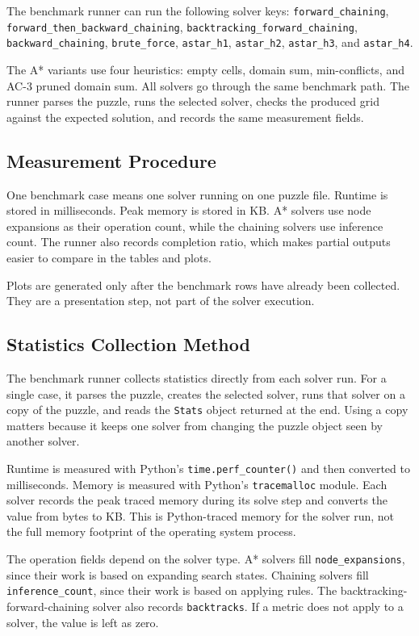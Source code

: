 The benchmark runner can run the following solver keys:
\texttt{forward\_chaining},
\texttt{forward\_then\_backward\_chaining},
\texttt{backtracking\_forward\_chaining},
\texttt{backward\_chaining},
\texttt{brute\_force},
\texttt{astar\_h1},
\texttt{astar\_h2},
\texttt{astar\_h3}, and
\texttt{astar\_h4}.

The A* variants use four heuristics: empty cells, domain sum, min-conflicts, and
AC-3 pruned domain sum. All solvers go through the same benchmark path. The
runner parses the puzzle, runs the selected solver, checks the produced grid
against the expected solution, and records the same measurement fields.

\subsection{Measurement Procedure}

One benchmark case means one solver running on one puzzle file. Runtime is stored
in milliseconds. Peak memory is stored in KB. A* solvers use node expansions as
their operation count, while the chaining solvers use inference count. The
runner also records completion ratio, which makes partial outputs easier to
compare in the tables and plots.

Plots are generated only after the benchmark rows have already been collected.
They are a presentation step, not part of the solver execution.

\subsection{Statistics Collection Method}

The benchmark runner collects statistics directly from each solver run. For a
single case, it parses the puzzle, creates the selected solver, runs that solver
on a copy of the puzzle, and reads the \texttt{Stats} object returned at the end.
Using a copy matters because it keeps one solver from changing the puzzle object
seen by another solver.

Runtime is measured with Python's \texttt{time.perf\_counter()} and then
converted to milliseconds. Memory is measured with Python's \texttt{tracemalloc}
module. Each solver records the peak traced memory during its solve step and
converts the value from bytes to KB. This is Python-traced memory for the solver
run, not the full memory footprint of the operating system process.

The operation fields depend on the solver type. A* solvers fill
\texttt{node\_expansions}, since their work is based on expanding search states.
Chaining solvers fill \texttt{inference\_count}, since their work is based on
applying rules. The backtracking-forward-chaining solver also records
\texttt{backtracks}. If a metric does not apply to a solver, the value is left
as zero.

